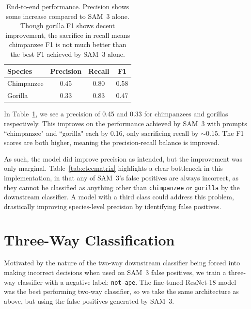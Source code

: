 \documentclass[author={Jacob Stephenson},
    degree={BSc},
    title={Robust Great Ape Species Detection in Wild Camera Trap Imagery with Promptable Concept Segmentation},
    unit={COMS30045},
    subtitle={}]{dissertation}
\begin{document}
\begin{table}[H]
    \centering

    \begin{tabular}{lccc}
        \toprule
        \textbf{Species} & \textbf{Precision} & \textbf{Recall} & \textbf{F1} \\
        \midrule
        Chimpanzee & 0.45 & 0.80 & 0.58 \\
        Gorilla & 0.33 & 0.83 & 0.47 \\
        \bottomrule
    \end{tabular}

    \caption[End-to-End Performance]{End-to-end performance. Precision shows some increase compared to SAM~3 alone. Though gorilla F1 shows decent improvement, the sacrifice in recall means chimpanzee F1 is not much better than the best F1 achieved by SAM~3 alone.}
    \label{tab:eteperformance}
\end{table}

In Table~\ref{tab:eteperformance}, we see a precision of 0.45 and 0.33 for chimpanzees and gorillas respectively. This improves on the performance achieved by SAM~3 with prompts ``chimpanzee" and ``gorilla" each by 0.16, only sacrificing recall by $\sim0.15$. The F1 scores are both higher, meaning the precision-recall balance is improved.

As such, the model did improve precision as intended, but the improvement was only marginal. Table~\ref{tab:etecmatrix} highlights a clear bottleneck in this implementation, in that any of SAM~3's false positives are always incorrect, as they cannot be classified as anything other than \texttt{chimpanzee} or \texttt{gorilla} by the downstream classifier. A model with a third class could address this problem, drastically improving species-level precision by identifying false positives.

\section{Three-Way Classification}
\label{sec:execution_classification3}

Motivated by the nature of the two-way downstream classifier being forced into making incorrect decisions when used on SAM~3 false positives, we train a three-way classifier with a negative label: \texttt{not-ape}. The fine-tuned ResNet-18 model was the best performing two-way classifier, so we take the same architecture as above, but using the false positives generated by SAM~3.
\end{document}
